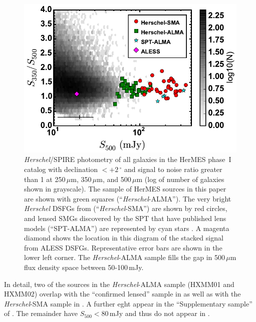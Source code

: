 \documentclass[iop]{emulateapj}
\begin{document}
\begin{figure}[!tbp] 
\includegraphics[width=\linewidth]{../Figures/spirecolflux.pdf}

\caption{ {\it Herschel}/SPIRE photometry of all galaxies in the HerMES phase~I
catalog with declination $< +2\,^\circ$ and signal to noise ratio greater than
1 at 250$\,\mu$m, 350$\,\mu$m, and 500$\,\mu$m (log of number of galaxies shown
in grayscale).  The sample of HerMES sources in this paper are shown with green
squares (``{\it Herschel}-ALMA'').  The very bright {\it Herschel} DSFGs from
\citet{Bussmann:2013lr} (``{\it Herschel}-SMA'') are shown by red circles, and
lensed SMGs discovered by the SPT that have published lens models
(``SPT-ALMA'') are represented by cyan stars \citep{Hezaveh:2013fk}.  A magenta
diamond shows the location in this diagram of the stacked signal from ALESS
DSFGs.  Representative error bars are shown in the lower left corner.  The {\it
Herschel}-ALMA sample fills the gap in 500$\,\mu$m flux density space between
50-100$\,$mJy.} \label{fig:sample}

\end{figure}

In detail, two of the sources in the {\it Herschel}-ALMA sample (HXMM01 and
HXMM02) overlap with the ``confirmed lensed'' sample in \citet{Wardlow:2013lr}
as well as with the {\it Herschel}-SMA sample in \citet{Bussmann:2013lr}.  A
further eght appear in the ``Supplementary sample'' of \citet{Wardlow:2013lr}.
The remainder have $S_{500} < 80\,$mJy and thus do not appear in
\citet{Wardlow:2013lr}.
\end{document}

